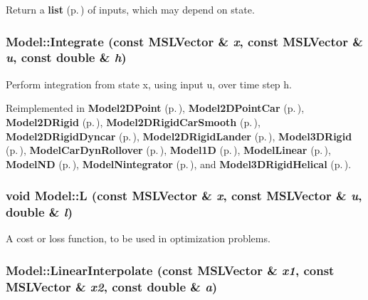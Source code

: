 Return a {\bf list} {\rm (p.\,\pageref{classlist})} of inputs, which may depend on state.

\subsubsection{ Model::Integrate (const {\bf MSLVector} \& {\em x}, const {\bf MSLVector} \& {\em u}, const double \& {\em h})\hspace{0.3cm}{\tt  [pure virtual]}}\label{classModel_a5}


Perform integration from state x, using input u, over time step h.



Reimplemented in {\bf Model2DPoint} {\rm (p.\,\pageref{classModel2DPoint_a2})}, {\bf Model2DPoint\-Car} {\rm (p.\,\pageref{classModel2DPointCar_a2})}, {\bf Model2DRigid} {\rm (p.\,\pageref{classModel2DRigid_a2})}, {\bf Model2DRigid\-Car\-Smooth} {\rm (p.\,\pageref{classModel2DRigidCarSmooth_a3})}, {\bf Model2DRigid\-Dyncar} {\rm (p.\,\pageref{classModel2DRigidDyncar_a2})}, {\bf Model2DRigid\-Lander} {\rm (p.\,\pageref{classModel2DRigidLander_a2})}, {\bf Model3DRigid} {\rm (p.\,\pageref{classModel3DRigid_a2})}, {\bf Model\-Car\-Dyn\-Rollover} {\rm (p.\,\pageref{classModelCarDynRollover_a5})}, {\bf Model1D} {\rm (p.\,\pageref{classModel1D_a3})}, {\bf Model\-Linear} {\rm (p.\,\pageref{classModelLinear_a3})}, {\bf Model\-ND} {\rm (p.\,\pageref{classModelND_a3})}, {\bf Model\-Nintegrator} {\rm (p.\,\pageref{classModelNintegrator_a3})}, and {\bf Model3DRigid\-Helical} {\rm (p.\,\pageref{classModel3DRigidHelical_a3})}.
\subsubsection{\setlength{\rightskip}{0pt plus 5cm}void Model::L (const {\bf MSLVector} \& {\em x}, const {\bf MSLVector} \& {\em u}, double \& {\em l})\hspace{0.3cm}{\tt  [inline, virtual]}}\label{classModel_a12}


A cost or loss function, to be used in optimization problems.

\subsubsection{ Model::Linear\-Interpolate (const {\bf MSLVector} \& {\em x1}, const {\bf MSLVector} \& {\em x2}, const double \& {\em a})\hspace{0.3cm}{\tt  [virtual]}}\label{classModel_a6}


